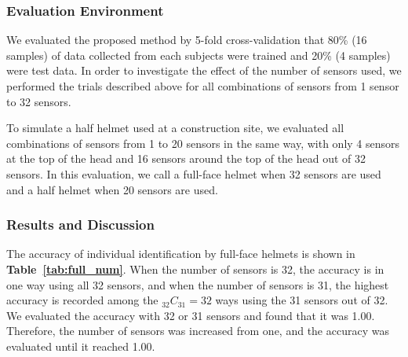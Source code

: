 \documentclass[sigchi,authordraft]{acmart}
\newcommand\tabref[1]{\textbf{Table~\ref{tab:#1}}}
\begin{document}
\subsubsection{Evaluation Environment}
We evaluated the proposed method by 5-fold cross-validation that 80\% (16 samples) of data collected from each subjects were trained and 20\% (4 samples) were test data. In order to investigate the effect of the number of sensors used, we performed the trials described above for all combinations of sensors from 1 sensor to 32 sensors.\par


To simulate a half helmet used at a construction site, we evaluated all combinations of sensors from 1 to 20 sensors in the same way, with only 4 sensors at the top of the head and 16 sensors around the top of the head out of 32 sensors. In this evaluation, we call a full-face helmet when 32 sensors are used and a half helmet when 20 sensors are used.


\subsubsection{Results and Discussion}
The accuracy of individual identification by full-face helmets is shown in \tabref{full_num}. When the number of sensors is 32, the accuracy is in one way using all 32 sensors, and when the number of sensors is 31, the highest accuracy is recorded among the $_{32}C_{31}=32$ ways using the 31 sensors out of 32. We evaluated the accuracy with 32 or 31 sensors and found that it was 1.00. Therefore, the number of sensors was increased from one, and the accuracy was evaluated until it reached 1.00.\par

\end{document}
